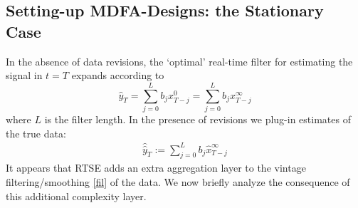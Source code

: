 \documentclass[11pt]{article}
\begin{document}
\subsection{Setting-up MDFA-Designs: the Stationary Case}

In the absence of data revisions, the `optimal' real-time filter for estimating the signal in $t=T$ expands according to
\[\hat{y}_T=\sum_{j=0}^Lb_jx_{T-j}^0=\sum_{j=0}^Lb_jx_{T-j}^{\infty}\]
where $L$ is the filter length. In the presence of revisions we plug-in estimates of the true data:
\begin{eqnarray}\label{finfil}
\hat{\hat{y}}_T:=\sum_{j=0}^Lb_j\hat{x}_{T-j}^{\infty}
\end{eqnarray}
It appears that RTSE adds an extra aggregation layer to the vintage filtering/smoothing \ref{fil} of the data. We now briefly analyze the consequence of this additional complexity layer. \\
\end{document}
